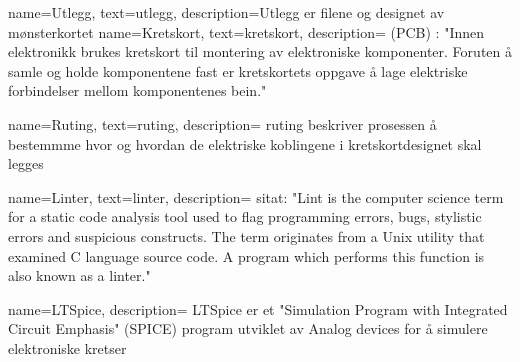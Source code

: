 {
    name=Utlegg,
    text=utlegg,
    description={Utlegg er filene og designet av mønsterkortet}
}
{
    name=Kretskort,
    text=kretskort,
    description={ 
        (PCB) : "Innen elektronikk brukes kretskort til montering av elektroniske komponenter. 
        Foruten å samle og holde komponentene fast er kretskortets oppgave å lage elektriske forbindelser mellom komponentenes bein."\autocite{gls_IT_pcb}   }
}

{
    name=Ruting,
    text=ruting,
    description={
        ruting beskriver prosessen å bestemmme hvor og hvordan de elektriske koblingene i kretskortdesignet skal legges}
}


{
    name=Linter,
    text=linter,
    description={
        sitat: "Lint is the computer science term for a static code analysis tool used to flag programming errors, bugs, stylistic errors and suspicious constructs.
        The term originates from a Unix utility that examined C language source code. A program which performs this function is also known as a linter."\autocite{gls_IT_linter}}
}

{
    name=LTSpice,
    description={
        LTSpice er et "Simulation Program with Integrated Circuit Emphasis" (SPICE) program utviklet av Analog devices for å simulere elektroniske kretser}
}